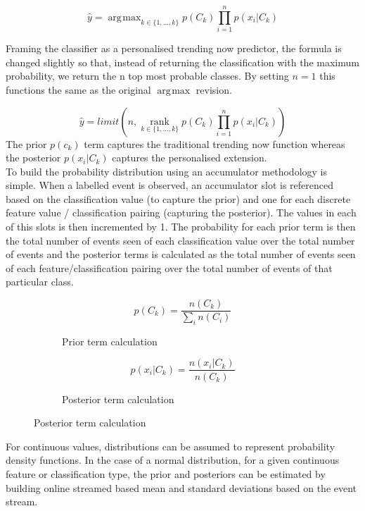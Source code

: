 \documentclass[a4paper,11pt]{scrreprt}
\DeclareMathOperator*{\argmax}{\arg\!\max}
\begin{document}
\[\hat{y}=\argmax_{k \in \{1,...,k\}} p(C_k)\prod_{i=1}^n p(x_i | C_k)\]

Framing the classifier as a personalised trending now predictor, the formula is changed slightly so that, instead of returning the classification with the maximum probability, we return the n top most probable classes. By setting \(n=1\) this functions the same as the original \(\argmax\) revision. 

\[\hat{y}=limit(n, \operatorname*{rank}_{k \in \{1,...,k\}} p(C_k)\prod_{i=1}^n p(x_i | C_k))\]
The prior \(p(c_k)\) term captures the traditional trending now function whereas the posterior \(p(x_i | C_k)\) captures the personalised extension.\\
To build the probability distribution using an accumulator methodology is simple. When a labelled event is observed, an accumulator slot is referenced based on the classification value (to capture the prior) and one for each discrete feature value / classification pairing (capturing the posterior). The values in each of this slots is then incremented by 1. The probability for each prior term is then the total number of events seen of each classification value over the total number of events and the posterior terms is calculated as the total number of events seen of each feature/classification pairing over the total number of events of that particular class.

\begin{figure}[h!]
\begin{subfigure}[t]{2 in}
\[p(C_k) = \frac{n(C_k)}{\sum_{i} n(C_i)}\]
\caption{Prior term calculation}
\end{subfigure}
\begin{subfigure}[t]{2 in}
\[p(x_i | C_k) = \frac{n(x_i | C_k)}{n(C_k)}\]
\caption{Posterior term calculation}
\end{subfigure}
\end{figure}
For continuous values, distributions can be assumed to represent probability density functions. In the case of a normal distribution, for a given continuous feature or classification type, the prior and posteriors can be estimated by building online streamed based mean and standard deviations based on the event stream. 
\end{document}
